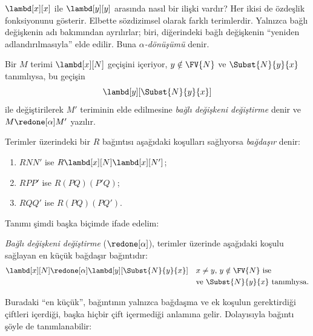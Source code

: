 \documentclass[../../../include/open-logic-section]{subfiles}
\begin{document}

$\lambd[x][x]$ ile $\lambd[y][y]$ arasında nasıl bir ilişki vardır? Her
ikisi de özdeşlik fonksiyonunu gösterir. Elbette sözdizimsel olarak farklı
terimlerdir. Yalnızca bağlı değişkenin adı bakımından ayrılırlar; biri,
diğerindeki bağlı değişkenin ``yeniden adlandırılmasıyla'' elde edilir. Buna
\emph{$\alpha$-dönüşümü} denir.

\begin{defn}
  Bir $M$ terimi $\lambd[x][N]$ geçişini içeriyor, $y\notin\FV{N}$ ve
  $\Subst{N}{y}{x}$ tanımlıysa, bu geçişin
  \begin{equation*}
    \lambd[y][\Subst{N}{y}{x}]
  \end{equation*}
  ile değiştirilerek $M'$ teriminin elde edilmesine \emph{bağlı değişkeni
  değiştirme} denir ve $M\redone[\alpha]M'$ yazılır.
\end{defn}

\begin{defn}
  Terimler üzerindeki bir $R$ bağıntısı aşağıdaki koşulları sağlıyorsa
  \emph{bağdaşır} denir:
  \begin{enumerate}
  \item $R N N'$ ise $R \lambd[x][N] \lambd[x][N']$;
  \item $R P P'$ ise $R (PQ) (P'Q)$;
  \item $R Q Q'$ ise $R (PQ) (PQ')$.
  \end{enumerate}
\end{defn}

Tanımı şimdi başka biçimde ifade edelim:
\begin{defn}
  \emph{Bağlı değişkeni değiştirme} ($\redone[\alpha]$), terimler üzerinde
  aşağıdaki koşulu sağlayan en küçük bağdaşır bağıntıdır:
  \begin{align*}
    &\lambd[x][N] \redone[\alpha] \lambd[y][\Subst{N}{y}{x}] && \text{$x
      \neq y$, $y \notin \FV{N}$ ise} \\
    & &&\text{ve $\Subst{N}{y}{x}$ tanımlıysa.}
  \end{align*}
\end{defn}

Buradaki ``en küçük'', bağıntının yalnızca bağdaşma ve ek koşulun
gerektirdiği çiftleri içerdiği, başka hiçbir çift içermediği anlamına gelir.
Dolayısıyla bağıntı şöyle de tanımlanabilir:
\end{document}
